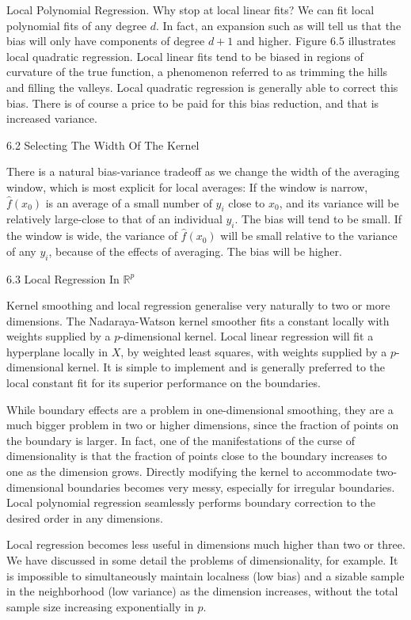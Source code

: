 Local Polynomial Regression. Why stop at local linear fits? We can fit local polynomial fits of any degree $d$. In fact, an expansion such as will tell us that the bias will only have components of degree $d+1$ and higher. Figure 6.5 illustrates local quadratic regression. Local linear fits tend to be biased in regions of curvature of the true function, a phenomenon referred to as trimming the hills and filling the valleys. Local quadratic regression is generally able to correct this bias. There is of course a price to be paid for this bias reduction, and that is increased variance.

6.2 Selecting The Width Of The Kernel

There is a natural bias-variance tradeoff as we change the width of the averaging window, which is most explicit for local averages: If the window is narrow, $\hat{f}(x_0)$ is an average of a small number of $y_i$ close to $x_0$, and its variance will be relatively large-close to that of an individual $y_i$. The bias will tend to be small. If the window is wide, the variance of $\hat{f}(x_0)$ will be small relative to the variance of any $y_i$, because of the effects of averaging. The bias will be higher.

6.3 Local Regression In $\mathbb{R}^p$

Kernel smoothing and local regression generalise very naturally to two or more dimensions. The Nadaraya-Watson kernel smoother fits a constant locally with weights supplied by a $p$-dimensional kernel. Local linear regression will fit a hyperplane locally in $X$, by weighted least squares, with weights supplied by a $p$-dimensional kernel. It is simple to implement and is generally preferred to the local constant fit for its superior performance on the boundaries.

While boundary effects are a problem in one-dimensional smoothing,
they are a much bigger problem in two or higher dimensions, since the
fraction of points on the boundary is larger. In fact, one of the manifestations of the curse of dimensionality is that the fraction of points close to the boundary increases to one as the dimension grows. Directly modifying the kernel to accommodate two-dimensional boundaries becomes very messy, especially for irregular boundaries. Local polynomial regression seamlessly performs boundary correction to the desired order in any dimensions.

Local regression becomes less useful in dimensions much higher than two or three. We have discussed in some detail the problems of dimensionality, for example. It is impossible to simultaneously maintain localness (low bias) and a sizable sample in the neighborhood (low variance) as the dimension increases, without the total sample size increasing exponentially in $p$.

